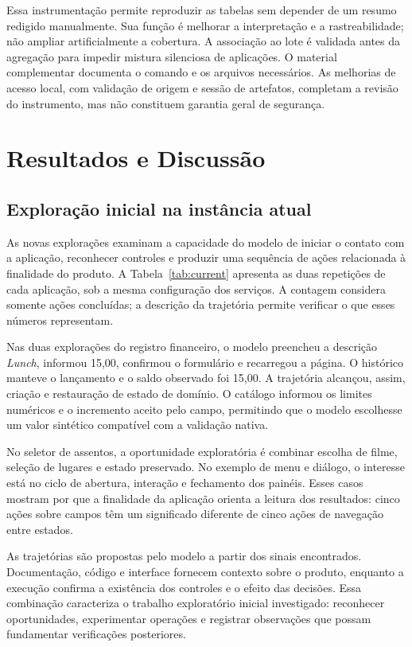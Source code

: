\documentclass[12pt]{article}
\begin{document}
Essa instrumentação permite reproduzir as tabelas sem depender de um resumo redigido manualmente. Sua função é melhorar a interpretação e a rastreabilidade; não ampliar artificialmente a cobertura. A associação ao lote é validada antes da agregação para impedir mistura silenciosa de aplicações. O material complementar documenta o comando e os arquivos necessários. As melhorias de acesso local, com validação de origem e sessão de artefatos, completam a revisão do instrumento, mas não constituem garantia geral de segurança.


\section{Resultados e Discussão}\label{sec:results}
\subsection{Exploração inicial na instância atual}
As novas explorações examinam a capacidade do modelo de iniciar o contato com a aplicação, reconhecer controles e produzir uma sequência de ações relacionada à finalidade do produto. A Tabela~\ref{tab:current} apresenta as duas repetições de cada aplicação, sob a mesma configuração dos serviços. A contagem considera somente ações concluídas; a descrição da trajetória permite verificar o que esses números representam.



Nas duas explorações do registro financeiro, o modelo preencheu a descrição \textit{Lunch}, informou 15,00, confirmou o formulário e recarregou a página. O histórico manteve o lançamento e o saldo observado foi 15,00. A trajetória alcançou, assim, criação e restauração de estado de domínio. O catálogo informou os limites numéricos e o incremento aceito pelo campo, permitindo que o modelo escolhesse um valor sintético compatível com a validação nativa.

No seletor de assentos, a oportunidade exploratória é combinar escolha de filme, seleção de lugares e estado preservado. No exemplo de menu e diálogo, o interesse está no ciclo de abertura, interação e fechamento dos painéis. Esses casos mostram por que a finalidade da aplicação orienta a leitura dos resultados: cinco ações sobre campos têm um significado diferente de cinco ações de navegação entre estados.

As trajetórias são propostas pelo modelo a partir dos sinais encontrados. Documentação, código e interface fornecem contexto sobre o produto, enquanto a execução confirma a existência dos controles e o efeito das decisões. Essa combinação caracteriza o trabalho exploratório inicial investigado: reconhecer oportunidades, experimentar operações e registrar observações que possam fundamentar verificações posteriores.
\end{document}
